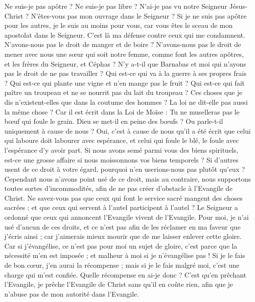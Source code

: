 \begin{multicols}{2}
\VerseOne{}Ne suis-je pas apôtre ? Ne suis-je pas libre ? N’ai-je pas vu notre Seigneur Jésus-Christ ? N’êtes-vous pas mon ouvrage dans le Seigneur ?
Si je ne suis pas apôtre pour les autres, je le suis au moins pour vous, car vous êtes le sceau de mon apostolat dans le Seigneur.
C'est là ma défense contre ceux qui me condamnent.
N'avons-nous pas le droit de manger et de boire ?
N'avons-nous pas le droit de mener avec nous une sœur qui soit notre femme, comme font les autres apôtres, et les frères du Seigneur, et Céphas ?
N'y a-t-il que Barnabas et moi qui n'ayons pas le droit de ne pas travailler ?
Qui est-ce qui va à la guerre à ses propres frais ? Qui est-ce qui plante une vigne et n’en mange pas le fruit ? Qui est-ce qui fait paître un troupeau et ne se nourrit pas du lait du troupeau ?
Ces choses que je dis n’existent-elles que dans la coutume des hommes ? La loi ne dit-elle pas aussi la même chose ?
Car il est écrit dans la Loi de Moïse : Tu ne muselleras pas le bœuf qui foule le grain. Dieu se met-il en peine des bœufs ?
Ou parle-t-il uniquement à cause de nous ? Oui, c’est à cause de nous qu’il a été écrit que celui qui laboure doit labourer avec espérance, et celui qui foule le blé, le foule avec l’espérance d’y avoir part.
Si nous avons semé parmi vous des biens spirituels, est-ce une grosse affaire si nous moissonnons vos biens temporels ?
Si d'autres usent de ce droit à votre égard, pourquoi n'en userions-nous pas plutôt qu'eux ? Cependant nous n'avons point usé de ce droit, mais au contraire, nous supportons toutes sortes d'incommodités, afin de ne pas créer d’obstacle à l'Evangile de Christ.
Ne savez-vous pas que ceux qui font le service sacré mangent des choses sacrées ; et que ceux qui servent à l'autel participent à l'autel ?
Le Seigneur a ordonné que ceux qui annoncent l'Evangile vivent de l'Evangile.
Pour moi, je n’ai usé d’aucun de ces droits, et ce n’est pas afin de les réclamer en ma faveur que j’écris ainsi ; car j’aimerais mieux mourir que de me laisser enlever cette gloire.
Car si j'évangélise, ce n’est pas pour moi un sujet de gloire, c’est parce que la nécessité m'en est imposée ; et malheur à moi si je n'évangélise pas !
Si je le fais de bon cœur, j’en aurai la récompense ; mais si je le fais malgré moi, c’est une charge qui m’est confiée.
Quelle récompense en ai-je donc ? C’est qu'en prêchant l'Evangile, je prêche l'Evangile de Christ sans qu'il en coûte rien, afin que je n'abuse pas de mon autorité dans l'Evangile.

\end{multicols}
